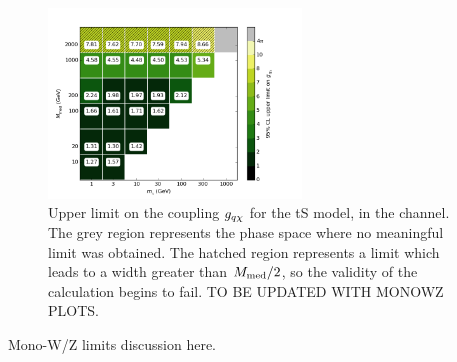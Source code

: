\begin{figure}[!h]
  \centering
    \includegraphics[width=0.6\textwidth]{figures/grid_allpoints_TSD_rat1.png}
    \caption{Upper limit on the coupling $g_{q \chi}$ for the tS model, in the \monoWZ channel. The grey region represents the phase space where no meaningful limit was obtained. The hatched region represents a limit which leads to a width greater than $M_{\mathrm{med}} / 2$, so the validity of the calculation begins to fail. TO BE UPDATED WITH MONOWZ PLOTS.}
    \label{fig:MonoWZ_TSD_couplinglimit}
\end{figure}

Mono-W/Z limits discussion here.
